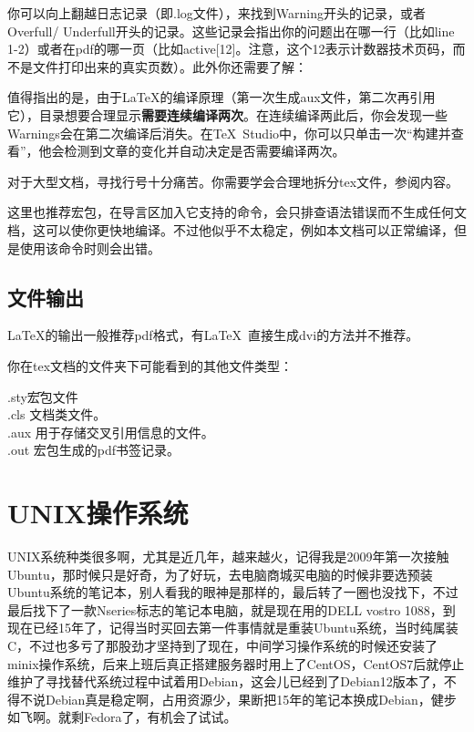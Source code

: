 	你可以向上翻越日志记录（即.log文件），来找到Warning开头的记录，或者Overfull/ Underfull开头的记录。这些记录会指出你的问题出在哪一行（比如line 1-2）或者在pdf的哪一页（比如active[12]。注意，这个12表示计数器技术页码，而不是文件打印出来的真实页数）。此外你还需要了解：
\begin{feai}
\item 值得指出的是，由于\LaTeX{}的编译原理（第一次生成aux文件，第二次再引用它），目录想要合理显示{\bfseries{需要连续编译两次}}。在连续编译两此后，你会发现一些Warnings会在第二次编译后消失。在\TeX\ Studio中，你可以只单击一次“构建并查看”，他会检测到文章的变化并自动决定是否需要编译两次。
\item 对于大型文档，寻找行号十分痛苦。你需要学会合理地拆分tex文件，参阅内容。%
\end{feai}

	这里也推荐宏包，在导言区加入它支持的命令，会只排查语法错误而不生成任何文档，这可以使你更快地编译。不过他似乎不太稳定，例如本文档可以正常编译，但是使用该命令时则会出错。
\subsection{文件输出}
	\LaTeX{}的输出一般推荐pdf格式，有\LaTeX\ 直接生成dvi的方法并不推荐。

你在tex文档的文件夹下可能看到的其他文件类型：
\begin{tabbing}
	.sty{\hspace{2em}}\=宏包文件\\%
	.cls	\> 文档类文件。\\
	.aux	\> 用于存储交叉引用信息的文件。\\
	.out	\> 宏包生成的pdf书签记录。
\end{tabbing}
\section{UNIX操作系统}
	UNIX系统种类很多啊，尤其是近几年，越来越火，记得我是2009年第一次接触Ubuntu，那时候只是好奇，为了好玩，去电脑商城买电脑的时候非要选预装Ubuntu系统的笔记本，别人看我的眼神是那样的，最后转了一圈也没找下，不过最后找下了一款Nseries标志的笔记本电脑，就是现在用的DELL vostro 1088，到现在已经15年了，记得当时买回去第一件事情就是重装Ubuntu系统，当时纯属装C，不过也多亏了那股劲才坚持到了现在，中间学习操作系统的时候还安装了minix操作系统，后来上班后真正搭建服务器时用上了CentOS，CentOS7后就停止维护了寻找替代系统过程中试着用Debian，这会儿已经到了Debian12版本了，不得不说Debian真是稳定啊，占用资源少，果断把15年的笔记本换成Debian，健步如飞啊。就剩Fedora了，有机会了试试。
